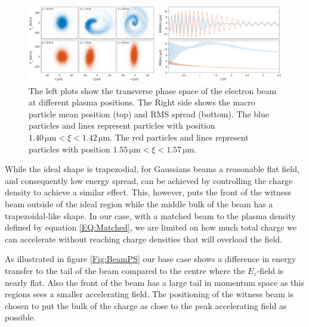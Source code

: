\documentclass[aps,prstab,reprint,amsmath,amssymb,groupedaddress]{revtex4-1}
\newcommand{\unit}[1]{\,\mathrm{#1}}
\begin{document}
\begin{figure}[hbt]
    \includegraphics[width=\linewidth,trim={0mm 0mm 0mm 0mm},clip]{figures/beamFilamentationAll}
    \caption{\label{Fig:BeamFilament} The left plots show the transverse phase space of the electron beam at different
        plasma positions. The Right side shows the macro particle mean position (top) and RMS spread (bottom). The blue
        particles and lines represent particles with position $1.40\unit{\mu m} < \xi < 1.42\unit{\mu m}$. The red
        particles and lines represent particles with position $1.55\unit{\mu m} < \xi < 1.57\unit{\mu m}$.}
\end{figure}

While the ideal shape is trapezodial, for Gaussians beams a reasonable flat field, and consequently low energy spread,
can be achieved by controlling the charge density to achieve a similar effect. This, however, puts the front of the
witness beam outside of the ideal region while the middle bulk of the beam has a trapezoidal-like shape. In our case,
with a matched beam to the plasma density defined by equation \ref{EQ:Matched}, we are limited on how much total charge
we can accelerate without reaching charge densities that will overload the field.

As illustrated in figure \ref{Fig:BeamPS} our base case shows a difference in energy transfer to the tail of the beam
compared to the centre where the $E_{z}$-field is nearly flat. Also the front of the beam has a large tail in momentum
space as this regions sees a smaller accelerating field. The positioning of the witness beam is chosen to put the bulk
of the charge as close to the peak accelerating field as possible.
\end{document}
